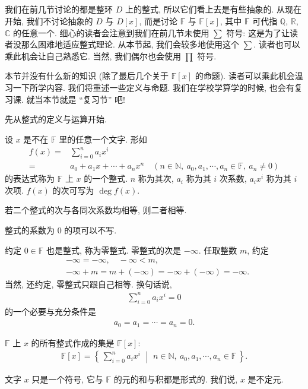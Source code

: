 \subsection*{\PolynomialsOverF}
\markright{\PolynomialsOverF}

我们在前几节讨论的都是整环 $D$ 上的整式, 所以它们看上去是有些抽象的. 从现在开始, 我们不讨论抽象的 $D$ 与 $D[x]$, 而是讨论 $\mathbb{F}$ 与 $\mathbb{F}[x]$, 其中 $\mathbb{F}$ 可代指 $\mathbb{Q}$, $\mathbb{R}$, $\mathbb{C}$ 的任意一个. 细心的读者会注意到我们在前几节未使用 $\sum$ 符号: 这是为了让读者没那么困难地适应整式理论. 从本节起, 我们会较多地使用这个 $\sum$. 读者也可以乘此机会让自己熟悉它. 当然, 我们偶尔也会使用 $\prod$ 符号.

本节并没有什么新的知识 (除了最后几个关于 $\mathbb{F}[x]$ 的命题). 读者可以乘此机会温习一下所学内容. 我们将重述一些定义与命题. 我们在学校学算学的时候, 也会有复习课. 就当本节就是 ``复习节'' 吧!

先从整式的定义与运算开始.

\begin{definition}
    设 $x$ 是不在 $\mathbb{F}$ 里的任意一个文字. 形如
    \begin{align*}
        f(x)
        = {} & \sum_{i=0}^n a_i x^i                                                                                     \\
        = {} & a_0 + a_1 x + \cdots + a_n x^n \quad (n \in \mathbb{N},\ a_0,a_1,\cdots,a_n \in \mathbb{F},\ a_n \neq 0)
    \end{align*}
    的表达式称为 $\mathbb{F}$ 上 $x$ 的一个整式. $n$ 称为其次, $a_i$ 称为其 $i$ 次系数, $a_i x^i$ 称为其 $i$ 次项. $f(x)$ 的次可写为 $\deg f(x)$.

    若二个整式的次与各同次系数均相等, 则二者相等.

    整式的系数为 $0$ 的项可以不写.

    约定 $0 \in \mathbb{F}$ 也是整式, 称为零整式. 零整式的次是 $-\infty$. 任取整数 $m$, 约定
    \begin{align*}
         & -\infty = -\infty, \quad -\infty < m,                        \\
         & -\infty + m = m + (-\infty) = -\infty + (-\infty) = -\infty.
    \end{align*}
    当然, 还约定, 零整式只跟自己相等. 换句话说,
    \begin{align*}
        \sum_{i=0}^n a_i x^i = 0
    \end{align*}
    的一个必要与充分条件是
    \begin{align*}
        a_0 = a_1 = \cdots = a_n = 0.
    \end{align*}

    $\mathbb{F}$ 上 $x$ 的所有整式作成的集是 $\mathbb{F}[x]$:
    \begin{align*}
        \mathbb{F}[x] = \left\{\, \sum_{i=0}^n a_i x^i \,\,\middle|\,\, n \in \mathbb{N},\ a_0,a_1,\cdots,a_n \in \mathbb{F} \,\right\}.
    \end{align*}

    文字 $x$ 只是一个符号, 它与 $\mathbb{F}$ 的元的和与积都是形式的. 我们说, $x$ 是不定元.
\end{definition}

